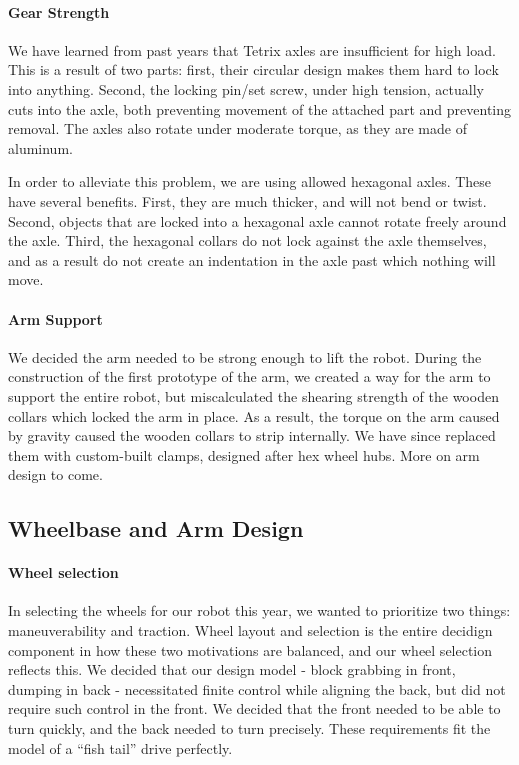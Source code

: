\paragraph{Gear Strength} We have learned from past years that Tetrix axles are insufficient for high load. This is a result of two parts: first, their circular design makes them hard to lock into anything. Second, the locking pin/set screw, under high tension, actually cuts into the axle, both preventing movement of the attached part and preventing removal. The axles also rotate under moderate torque, as they are made of aluminum.

In order to alleviate this problem, we are using allowed hexagonal axles. These have several benefits. First, they are much thicker, and will not bend or twist. Second, objects that are locked into a hexagonal axle cannot rotate freely around the axle. Third, the hexagonal collars do not lock against the axle themselves, and as a result do not create an indentation in the axle past which nothing will move. 

\paragraph{Arm Support} We decided the arm needed to be strong enough to lift the robot. During the construction of the first prototype of the arm, we created a way for the arm to support the entire robot, but miscalculated the shearing strength of the wooden collars which locked the arm in place. As a result, the torque on the arm caused by gravity caused the wooden collars to strip internally. We have since replaced them with custom-built clamps, designed after hex wheel hubs. More on arm design to come.

\newpage \subsection{Wheelbase and Arm Design}
\paragraph{Wheel selection} In selecting the wheels for our robot this year, we wanted to prioritize two things: maneuverability and traction. Wheel layout and selection is the entire decidign component in how these two motivations are balanced, and our wheel selection reflects this. We decided that our design model - block grabbing in front, dumping in back - necessitated finite control while aligning the back, but did not require such control in the front. We decided that the front needed to be able to turn quickly, and the back needed to turn precisely. These requirements fit the model of a ``fish tail'' drive perfectly.

